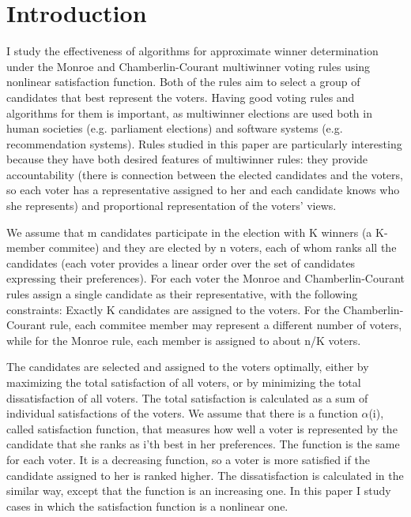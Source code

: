 \chapter{Introduction}
\label{cha:introduction}

I study the effectiveness of algorithms for approximate winner determination under the Monroe and Chamberlin-Courant multiwinner voting rules using nonlinear satisfaction function. Both of the rules aim to select a group of candidates that best represent the voters. Having good voting rules and algorithms for them is important, as multiwinner elections are used both in human societies (e.g. parliament elections) and software systems (e.g. recommendation systems). Rules studied in this paper are particularly interesting because they have both desired features of multiwinner rules: they provide accountability (there is connection between the elected candidates and the voters, so each voter has a representative assigned to her and each candidate knows who she represents) and proportional representation of the voters’ views.

We assume that m candidates participate in the election with K winners (a K-member commitee) and they are elected by n voters, each of whom ranks all the candidates (each voter provides a linear order over the set of candidates expressing their preferences). For each voter the Monroe and Chamberlin-Courant rules assign a single candidate as their representative, with the following constraints:
Exactly K candidates are assigned to the voters. For the Chamberlin-Courant rule, each commitee member may represent a different number of voters, while for the Monroe rule, each member is assigned to about n/K voters.

The candidates are selected and assigned to the voters optimally, either by maximizing the total satisfaction of all voters, or by minimizing the total dissatisfaction of all voters.
The total satisfaction is calculated as a sum of individual satisfactions of the voters. We assume that there is a function $\alpha$(i), called satisfaction function, that measures how well a voter is represented by the candidate that she ranks as i’th best in her preferences. The function is the same for each voter. It is a decreasing function, so a voter is more satisfied if the candidate assigned to her is ranked higher. The dissatisfaction is calculated in the similar way, except that the function is an increasing one. In this paper I study cases in which the satisfaction function is a nonlinear one.

